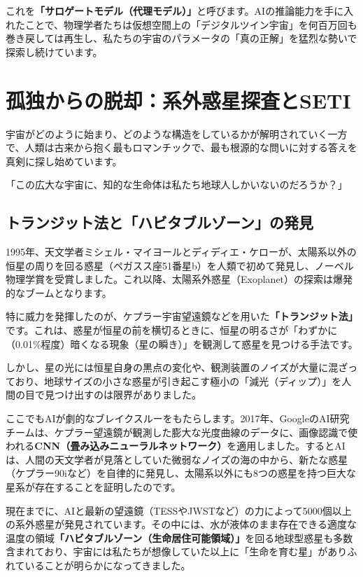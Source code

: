 これを\textbf{「サロゲートモデル（代理モデル）」}と呼びます。AIの推論能力を手に入れたことで、物理学者たちは仮想空間上の「デジタルツイン宇宙」を何百万回も巻き戻しては再生し、私たちの宇宙のパラメータの「真の正解」を猛烈な勢いで探索し続けています。

\section{孤独からの脱却：系外惑星探査とSETI}

宇宙がどのように始まり、どのような構造をしているかが解明されていく一方で、人類は古来から抱く最もロマンチックで、最も根源的な問いに対する答えを真剣に探し始めています。

「この広大な宇宙に、知的な生命体は私たち地球人しかいないのだろうか？」

\subsection{トランジット法と「ハビタブルゾーン」の発見}

1995年、天文学者ミシェル・マイヨールとディディエ・ケローが、太陽系以外の恒星の周りを回る惑星（ペガスス座51番星b）を人類で初めて発見し、ノーベル物理学賞を受賞しました。これ以降、太陽系外惑星（Exoplanet）の探索は爆発的なブームとなります。

特に威力を発揮したのが、ケプラー宇宙望遠鏡などを用いた\textbf{「トランジット法」}です。これは、惑星が恒星の前を横切るときに、恒星の明るさが「わずかに（0.01\%程度）暗くなる現象（星の瞬き）」を観測して惑星を見つける手法です。

しかし、星の光には恒星自身の黒点の変化や、観測装置のノイズが大量に混ざっており、地球サイズの小さな惑星が引き起こす極小の「減光（ディップ）」を人間の目で見つけ出すのは限界がありました。

ここでもAIが劇的なブレイクスルーをもたらします。2017年、GoogleのAI研究チームは、ケプラー望遠鏡が観測した膨大な光度曲線のデータに、画像認識で使われる\textbf{CNN（畳み込みニューラルネットワーク）}を適用しました。するとAIは、人間の天文学者が見落としていた微弱なノイズの海の中から、新たな惑星（ケプラー90iなど）を自律的に発見し、太陽系以外にも8つの惑星を持つ巨大な星系が存在することを証明したのです。

現在までに、AIと最新の望遠鏡（TESSやJWSTなど）の力によって5000個以上の系外惑星が発見されています。その中には、水が液体のまま存在できる適度な温度の領域\textbf{「ハビタブルゾーン（生命居住可能領域）」}を回る地球型惑星も多数含まれており、宇宙には私たちが想像していた以上に「生命を育む星」がありふれていることが明らかになってきました。


